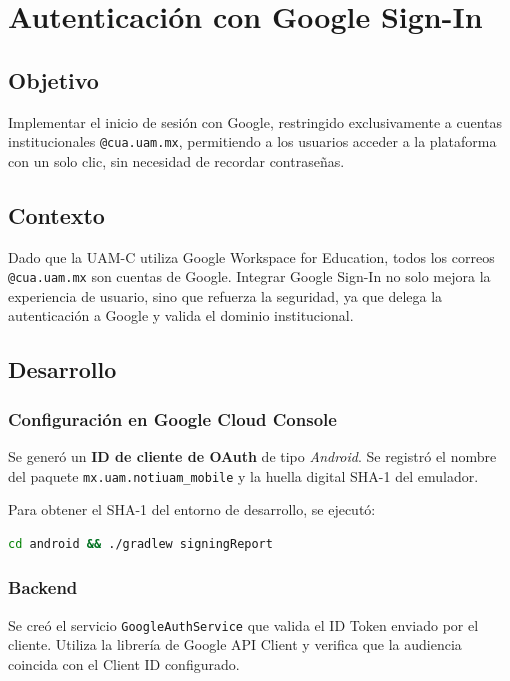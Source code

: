 \chapter{Autenticación con Google Sign-In}
\label{ch:google_signin}

\section{Objetivo}

Implementar el inicio de sesión con Google, restringido exclusivamente a cuentas institucionales \texttt{@cua.uam.mx}, permitiendo a los usuarios acceder a la plataforma con un solo clic, sin necesidad de recordar contraseñas.

\section{Contexto}

Dado que la UAM-C utiliza Google Workspace for Education, todos los correos \texttt{@cua.uam.mx} son cuentas de Google. Integrar Google Sign-In no solo mejora la experiencia de usuario, sino que refuerza la seguridad, ya que delega la autenticación a Google y valida el dominio institucional.

\section{Desarrollo}

\subsection{Configuración en Google Cloud Console}

Se generó un \textbf{ID de cliente de OAuth} de tipo \textit{Android}. Se registró el nombre del paquete \texttt{mx.uam.notiuam\_mobile} y la huella digital SHA-1 del emulador.

Para obtener el SHA-1 del entorno de desarrollo, se ejecutó:

\begin{lstlisting}[language=bash]
cd android && ./gradlew signingReport
\end{lstlisting}

\subsection{Backend}

Se creó el servicio \texttt{GoogleAuthService} que valida el ID Token enviado por el cliente. Utiliza la librería de Google API Client y verifica que la audiencia coincida con el Client ID configurado.

